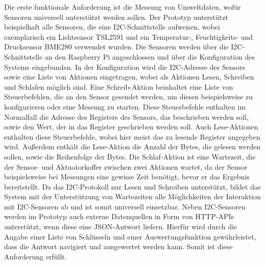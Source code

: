 Die erste funktionale Anforderung ist die Messung von Umweltdaten, wofür Sensoren universell unterstützt werden sollen.
Der Prototyp unterstützt beispielhaft alle Sensoren, die eine I2C-Schnittstelle aufweisen, wobei exemplarisch ein Lichtsensor TSL2591 und ein Temperatur-, Feuchtigkeits- und Drucksensor BME280 verwendet wurden.
Die Sensoren werden über die I2C-Schnittstelle an den Raspberry Pi angeschlossen und über die Konfiguration des Systems eingebunden.
In der Konfiguration wird die I2C-Adresse des Sensors sowie eine Liste von Aktionen eingetragen, wobei als Aktionen Lesen, Schreiben und Schlafen möglich sind.
Eine Schreib-Aktion beinhaltet eine Liste von Steuerbefehlen, die an den Sensor gesendet werden, um diesen beispielsweise zu konfigurieren oder eine Messung zu starten.
Diese Steuerbefehle enthalten im Normalfall die Adresse des Registers des Sensors, das beschrieben werden soll, sowie den Wert, der in das Register geschrieben werden soll.
Auch Lese-Aktionen enthalten diese Steuerbefehle, wobei hier meist das zu lesende Register angegeben wird.
Außerdem enthält die Lese-Aktion die Anzahl der Bytes, die gelesen werden sollen, sowie die Reihenfolge der Bytes.
Die Schlaf-Aktion ist eine Wartezeit, die der Sensor- und Aktuatorkoffer zwischen zwei Aktionen wartet, da der Sensor beispielsweise bei Messungen eine gewisse Zeit benötigt, bevor er das Ergebnis bereitstellt.
Da das I2C-Protokoll nur Lesen und Schreiben unterstützt, bildet das System mit der Unterstützung von Wartezeiten alle Möglichkeiten der Interaktion mit I2C-Sensoren ab und ist somit universell einsetzbar.
Neben I2C-Sensoren werden im Prototyp auch externe Datenquellen in Form von HTTP-APIs unterstützt, wenn diese eine JSON-Antwort liefern.
Hierfür wird durch die Angabe einer Liste von Schlüsseln und einer Auswertungsfunktion gewährleistet, dass die Antwort navigiert und ausgewertet werden kann.
Somit ist diese Anforderung erfüllt.

